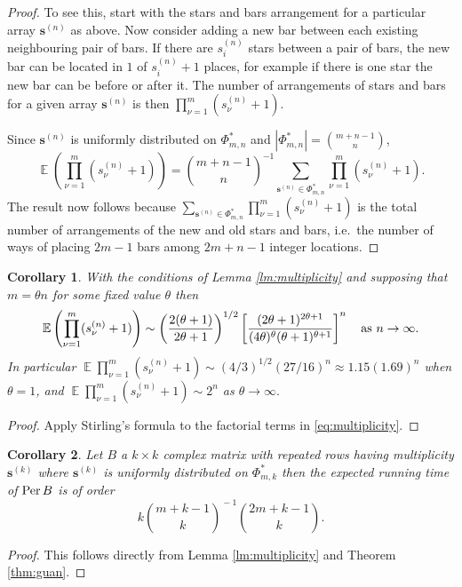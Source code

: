 \documentclass[a4paper,11pt]{article}
\newtheorem{corollary}{Corollary}
\newcommand{\perm}{\mathop{\textup{Per}}}
\newcommand{\EX}{\mathop{{}\mathbb{E}}}
\begin{document}
\begin{proof}
	To see this, start with the stars and bars arrangement for a particular array $\mathbf{s}^{(n)}$ as above. Now consider adding a new bar between each existing neighbouring pair of bars.  If there are $s_i^{(n)}$ stars between a pair of bars, the new bar can be located in $1$ of $s_i^{(n)} + 1$ places, for example if there is one star the new bar can be before or after it.  The number of arrangements of stars and bars for a given array $\mathbf{s}^{(n)}$ is then $\prod_{\nu=1}^m (s^{(n)}_\nu +1)$.
	
Since $\mathbf{s}^{(n)}$ is uniformly distributed on $\Phi_{m,n}^*$ and $|\Phi_{m,n}^*| = \binom{m+n-1}{n}$, 
	$$\EX \left(\prod_{\nu=1}^m(s^{(n)}_\nu + 1)\right) =  \binom{m+n-1}{n}^{-1} \sum_{\mathbf{s}^{(n)} \in \Phi^*_{m,n}} 
	\prod_{\nu=1}^m(s^{(n)}_\nu + 1).$$
	The result now follows because $\sum_{\mathbf{s}^{(n)} \in \Phi_{m,n}^*} \prod_{\nu=1}^m(s^{(n)}_\nu + 1)$ is the total number of arrangements of the new and old stars and bars, i.e.\ the number of ways of placing $2m -1$ bars among $2 m + n -1$ integer locations. 
\end{proof}
\begin{corollary}
	With the conditions of Lemma \ref{lm:multiplicity} and supposing that $m = \theta n$ for some fixed value $\theta$ then 
	$$\EX \left(\prod_{\nu=1}^m(s_\nu^{(n)} + 1)\right) \sim \left(\frac{2(\theta+1)}{2\theta+1}\right)^{1/2} \left[\frac{(2 \theta+1)^{2 \theta+1}}{(4 \theta)^\theta(\theta+1)^{\theta+1}}\right]^n \quad \text{as $ n \to \infty$}.$$
	In particular $\EX \prod_{\nu=1}^m(s_\nu^{(n)} + 1) \sim (4/3)^{1/2} (27/16)^n \approx 1.15 (1.69)^n$ when $\theta = 1$, and $\EX \prod_{\nu=1}^m(s_\nu^{(n)} + 1) \sim  2^n$ as $\theta \to \infty.$ 
\end{corollary}
\begin{proof} Apply Stirling's formula to the factorial terms in \eqref{eq:multiplicity}. \end{proof}
\vspace{0.5em}
\begin{corollary} Let $B$ a $k \times k$ complex matrix with repeated rows having multiplicity $\mathbf{s}^{(k)}$ where $\mathbf{s}^{(k)}$ is uniformly distributed on $\Phi_{m,k}^*$ then the expected running time of $\perm B$ is of order
	$$ k \binom{ m+ k-1}{k}^{\!-1} \binom{2 m + k -1}{k}. $$
\end{corollary}
\begin{proof} This follows directly from Lemma \ref{lm:multiplicity} and Theorem \ref{thm:guan}. \end{proof}
\end{document}
